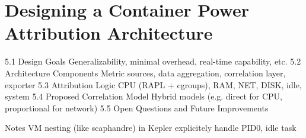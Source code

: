 \chapter{Designing a Container Power Attribution Architecture} %
\label{Chapter5}


    5.1 Design Goals
        Generalizability, minimal overhead, real-time capability, etc.
    5.2 Architecture Components
        Metric sources, data aggregation, correlation layer, exporter
    5.3 Attribution Logic
        CPU (RAPL + cgroups), RAM, NET, DISK, idle, system
    5.4 Proposed Correlation Model
        Hybrid models (e.g. direct for CPU, proportional for network)
    5.5 Open Questions and Future Improvements


Notes
    VM nesting (like scaphandre) in Kepler
    explicitely handle PID0, idle task
